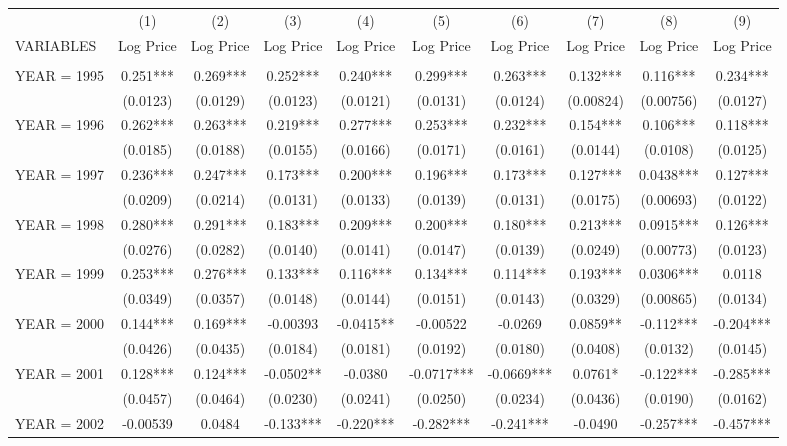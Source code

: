 \begin{tabular}{lccccccccc} \hline
 & (1) & (2) & (3) & (4) & (5) & (6) & (7) & (8) & (9) \\
VARIABLES & Log Price & Log Price & Log Price & Log Price & Log Price & Log Price & Log Price & Log Price & Log Price \\ \hline
 &  &  &  &  &  &  &  &  &  \\
YEAR = 1995 & 0.251*** & 0.269*** & 0.252*** & 0.240*** & 0.299*** & 0.263*** & 0.132*** & 0.116*** & 0.234*** \\
 & (0.0123) & (0.0129) & (0.0123) & (0.0121) & (0.0131) & (0.0124) & (0.00824) & (0.00756) & (0.0127) \\
YEAR = 1996 & 0.262*** & 0.263*** & 0.219*** & 0.277*** & 0.253*** & 0.232*** & 0.154*** & 0.106*** & 0.118*** \\
 & (0.0185) & (0.0188) & (0.0155) & (0.0166) & (0.0171) & (0.0161) & (0.0144) & (0.0108) & (0.0125) \\
YEAR = 1997 & 0.236*** & 0.247*** & 0.173*** & 0.200*** & 0.196*** & 0.173*** & 0.127*** & 0.0438*** & 0.127*** \\
 & (0.0209) & (0.0214) & (0.0131) & (0.0133) & (0.0139) & (0.0131) & (0.0175) & (0.00693) & (0.0122) \\
YEAR = 1998 & 0.280*** & 0.291*** & 0.183*** & 0.209*** & 0.200*** & 0.180*** & 0.213*** & 0.0915*** & 0.126*** \\
 & (0.0276) & (0.0282) & (0.0140) & (0.0141) & (0.0147) & (0.0139) & (0.0249) & (0.00773) & (0.0123) \\
YEAR = 1999 & 0.253*** & 0.276*** & 0.133*** & 0.116*** & 0.134*** & 0.114*** & 0.193*** & 0.0306*** & 0.0118 \\
 & (0.0349) & (0.0357) & (0.0148) & (0.0144) & (0.0151) & (0.0143) & (0.0329) & (0.00865) & (0.0134) \\
YEAR = 2000 & 0.144*** & 0.169*** & -0.00393 & -0.0415** & -0.00522 & -0.0269 & 0.0859** & -0.112*** & -0.204*** \\
 & (0.0426) & (0.0435) & (0.0184) & (0.0181) & (0.0192) & (0.0180) & (0.0408) & (0.0132) & (0.0145) \\
YEAR = 2001 & 0.128*** & 0.124*** & -0.0502** & -0.0380 & -0.0717*** & -0.0669*** & 0.0761* & -0.122*** & -0.285*** \\
 & (0.0457) & (0.0464) & (0.0230) & (0.0241) & (0.0250) & (0.0234) & (0.0436) & (0.0190) & (0.0162) \\
YEAR = 2002 & -0.00539 & 0.0484 & -0.133*** & -0.220*** & -0.282*** & -0.241*** & -0.0490 & -0.257*** & -0.457*** \\

\end{tabular}
